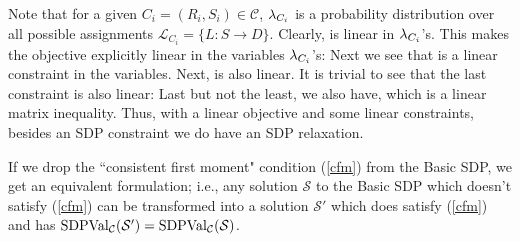 Note that for a given $C_i =(R_i, S_i) \in \mathcal{C}$, $\lambda_{C_i}$ is a probability distribution over all possible assignments $\mathcal{L}_{C_i} = \{L: S \rightarrow D\}$. Clearly,  
is linear in $\lambda_{C_i}$'s.
This makes the objective explicitly linear in the variables $\lambda_{C_i}$'s:
Next we see that 
is a linear constraint in the variables. Next, 
is also linear. 
It is trivial to see that the last constraint is also linear:
Last but not the least, we also have, 
which is a linear matrix inequality. Thus, with a linear objective and some linear constraints, besides an SDP constraint we do have an SDP relaxation.


\begin{remark}\label{remark01}
If we drop the ``consistent first moment" condition (\ref{cfm}) from the Basic SDP, we get
an equivalent formulation; i.e., any solution $\mathcal{S}$ to the Basic SDP which doesn't satisfy  (\ref{cfm}) can be transformed into a solution $\mathcal{S}'$ which does satisfy  (\ref{cfm}) and has $\mbox{SDPVal}_{\mathcal{C}}(\mathcal{S}')
= \mbox{SDPVal}_{\mathcal{C}} (\mathcal{S})$.
\end{remark}
\fi

